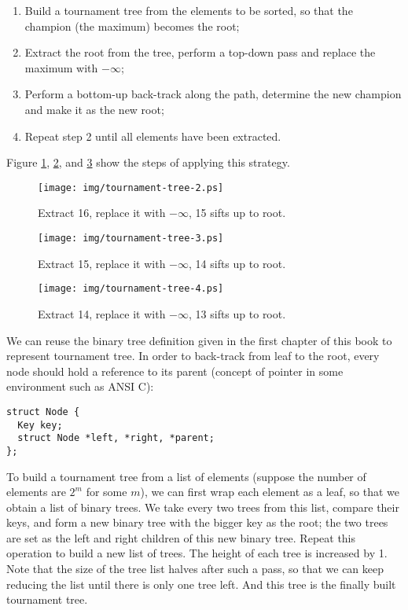 \documentclass{article}
\begin{document}
\begin{enumerate}
\item Build a tournament tree from the elements to be sorted, so that the champion (the maximum) becomes the root;
\item Extract the root from the tree, perform a top-down pass and replace the maximum with $-\infty$;
\item Perform a bottom-up back-track along the path, determine the new champion and make it as the new root;
\item Repeat step 2 until all elements have been extracted.
\end{enumerate}

Figure \ref{fig:tournament-tree-2}, \ref{fig:tournament-tree-3}, and \ref{fig:tournament-tree-4}
show the steps of applying this strategy.

\begin{figure}[htbp]
  \centering
  \texttt{[image: img/tournament-tree-2.ps]}
  \caption{Extract 16, replace it with $-\infty$, 15 sifts up to root.}
  \label{fig:tournament-tree-2}
\end{figure}

\begin{figure}[htbp]
  \centering
  \texttt{[image: img/tournament-tree-3.ps]}
  \caption{Extract 15, replace it with $-\infty$, 14 sifts up to root.}
  \label{fig:tournament-tree-3}
\end{figure}

\begin{figure}[htbp]
  \centering
  \texttt{[image: img/tournament-tree-4.ps]}
  \caption{Extract 14, replace it with $-\infty$, 13 sifts up to root.}
  \label{fig:tournament-tree-4}
\end{figure}

We can reuse the binary tree definition given in the first chapter of this book to represent
tournament tree. In order to back-track from leaf to the root, every node should hold a reference
to its parent (concept of pointer in some environment such as ANSI C):

\lstset{language=C}
\begin{lstlisting}
struct Node {
  Key key;
  struct Node *left, *right, *parent;
};
\end{lstlisting}

To build a tournament tree from a list of elements (suppose the number of elements are $2^m$ for some $m$),
we can first wrap each element as a leaf, so that we obtain a list of binary trees. We take every two
trees from this list, compare their keys, and form a new binary tree with the bigger key as the root;
the two trees are set as the left and right children of this new binary tree. Repeat this operation
to build a new list of trees. The height of each tree is increased by 1. Note that the size of the tree
list halves after such a pass, so that we can keep reducing the list until there is only one tree left.
And this tree is the finally built tournament tree.
\end{document}
